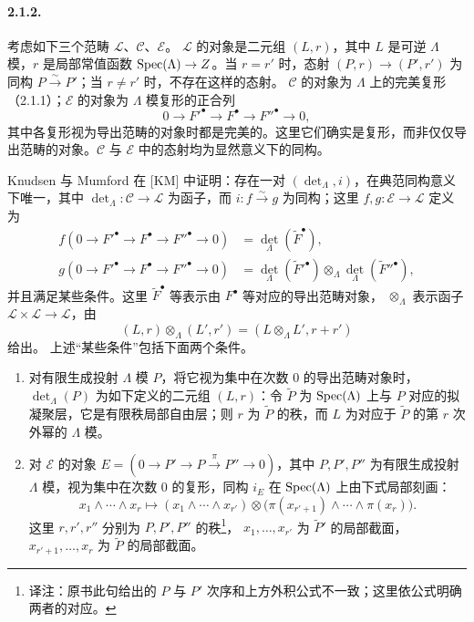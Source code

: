 \paragraph{2.1.2.}
考虑如下三个范畴 $\mathscr L$、$\mathscr C$、$\mathscr E$。
$\mathscr L$ 的对象是二元组 $(L,r)$，其中 $L$ 是可逆 $\Lambda$ 模，$r$ 是局部常值函数
$\operatorname{Spec}(\Lambda)\to Z$。当 $r=r'$ 时，态射 $(P,r)\to(P',r')$ 为同构 $P\xrightarrow{\sim}P'$；当 $r\ne r'$ 时，不存在这样的态射。
$\mathscr C$ 的对象为 $\Lambda$ 上的完美复形（2.1.1）；$\mathscr E$ 的对象为 $\Lambda$ 模复形的正合列
\[
0\longrightarrow F'^\bullet\longrightarrow F^\bullet
\longrightarrow F''^\bullet\longrightarrow0,
\]
其中各复形视为导出范畴的对象时都是完美的。这里它们确实是复形，而非仅仅导出范畴的对象。$\mathscr C$ 与 $\mathscr E$ 中的态射均为显然意义下的同构。

Knudsen 与 Mumford 在 [KM] 中证明：存在一对 $(\det_\Lambda,i)$，在典范同构意义下唯一，其中
$\det_\Lambda\colon\mathscr C\to\mathscr L$ 为函子，而 $i\colon f\xrightarrow{\sim}g$ 为同构；这里 $f,g\colon\mathscr E\to\mathscr L$ 定义为
\begin{align*}
f(0\to F'^\bullet\to F^\bullet\to F''^\bullet\to0)
 &=\det_\Lambda(\widetilde F^\bullet),\\
g(0\to F'^\bullet\to F^\bullet\to F''^\bullet\to0)
 &=\det_\Lambda(\widetilde F'^\bullet)\otimes_\Lambda
   \det_\Lambda(\widetilde F''^\bullet),
\end{align*}
并且满足某些条件。这里 $\widetilde F^\bullet$ 等表示由 $F^\bullet$ 等对应的导出范畴对象，
$\otimes_\Lambda$ 表示函子 $\mathscr L\times\mathscr L\to\mathscr L$，由
\[
(L,r)\otimes_\Lambda(L',r')=(L\otimes_\Lambda L',r+r')
\]
给出。
上述“某些条件”包括下面两个条件。
\begin{enumerate}[label=(\roman*)]
\item 对有限生成投射 $\Lambda$ 模 $P$，将它视为集中在次数 $0$ 的导出范畴对象时，
$\det_\Lambda(P)$ 为如下定义的二元组 $(L,r)$：令 $\widetilde P$ 为 $\operatorname{Spec}(\Lambda)$ 上与 $P$ 对应的拟凝聚层，它是有限秩局部自由层；则 $r$ 为 $\widetilde P$ 的秩，而 $L$ 为对应于 $\widetilde P$ 的第 $r$ 次外幂的 $\Lambda$ 模。
\item 对 $\mathscr E$ 的对象
$E=(0\to P'\to P\xrightarrow{\pi}P''\to0)$，其中 $P,P',P''$ 为有限生成投射 $\Lambda$ 模，视为集中在次数 $0$ 的复形，同构 $i_E$ 在 $\operatorname{Spec}(\Lambda)$ 上由下式局部刻画：
\[
x_1\wedge\cdots\wedge x_r\longmapsto
(x_1\wedge\cdots\wedge x_{r'})\otimes
\bigl(\pi(x_{r'+1})\wedge\cdots\wedge\pi(x_r)\bigr).
\]
这里 $r,r',r''$ 分别为 $P,P',P''$ 的秩\footnote{译注：原书此句给出的 $P$ 与 $P'$ 次序和上方外积公式不一致；这里依公式明确两者的对应。}，
$x_1,\ldots,x_{r'}$ 为 $\widetilde P'$ 的局部截面，
$x_{r'+1},\ldots,x_r$ 为 $\widetilde P$ 的局部截面。
\end{enumerate}

